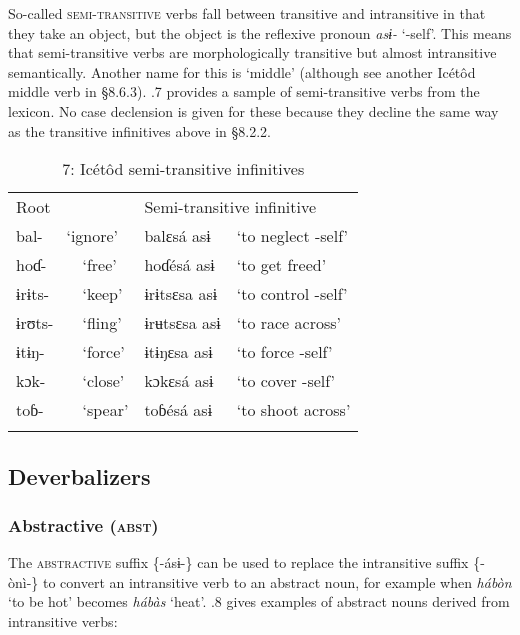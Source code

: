 So-called \textsc{semi-transitive} verbs fall between transitive and intransitive in that they take an object, but the object is the reflexive pronoun \textit{asɨ-} ‘-self’. This means that semi-transitive verbs are morphologically transitive but almost intransitive semantically. Another name for this is ‘middle’ (although see another Icétôd middle verb in §8.6.3). .7 provides a sample of semi-transitive verbs from the lexicon. No case declension is given for these because they decline the same way as the transitive infinitives above in §8.2.2.


\begin{table}
\caption{7: Icétôd semi-transitive infinitives}
\label{tab:8}


\begin{tabularx}{\textwidth}{XXXXX}
\lsptoprule

Root & \multicolumn{2}{X}{} & \multicolumn{2}{X}{Semi-transitive infinitive}\\
bal- & \multicolumn{2}{X}{‘ignore’} & balɛsá asɨ & ‘to neglect -self’\\
\multicolumn{2}{X}{hoɗ-} & ‘free’ & hoɗésá asɨ & ‘to get freed’\\
\multicolumn{2}{X}{ɨrɨts-} & ‘keep’ & ɨrɨtsɛsa asɨ & ‘to control -self’\\
\multicolumn{2}{X}{ɨrʊts-} & ‘fling’ & ɨrʉtsɛsa asɨ & ‘to race across’\\
\multicolumn{2}{X}{ɨtɨŋ-} & ‘force’ & ɨtɨŋɛsa asɨ & ‘to force -self’\\
\multicolumn{2}{X}{kɔk-} & ‘close’ & kɔkɛsá asɨ & ‘to cover -self’\\
\multicolumn{2}{X}{toɓ-} & ‘spear’ & toɓésá asɨ & ‘to shoot across’\\
\lspbottomrule
\end{tabularx}
\end{table}



\subsection{Deverbalizers}
\subsubsection{Abstractive (\textsc{abst})}

The \textsc{abstractive} suffix \{-ásɨ-\} can be used to replace the intransitive suffix \{-ònì-\} to convert an intransitive verb to an abstract noun, for example when \textit{hábòn} ‘to be hot’ becomes \textit{hábàs} ‘heat’. .8 gives examples of abstract nouns derived from intransitive verbs:


